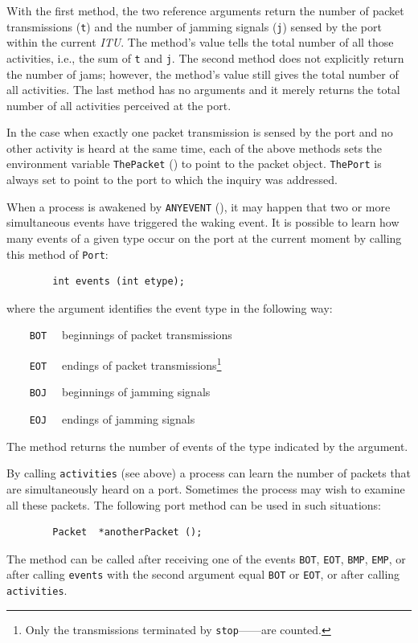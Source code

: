 With the first method,
the two reference arguments return the number of packet transmissions ({\tt t})
and the number of jamming signals ({\tt j}) sensed by the port within
the current {\em ITU}.
The method's value tells the total number of all those activities,
i.e., the sum of {\tt t} and {\tt j}.
The second method does not explicitly
return the number of jams; however, the method's
value still gives the total number of all activities.
The last method has no arguments and it merely returns the total number of all
activities perceived at the port.

In the case when exactly one packet transmission is sensed by the port and
no other activity is heard at the same time, each of the above methods
sets the environment variable {\tt ThePacket} () to point
to the packet object.
{\tt ThePort} is always set to point to the port to which the inquiry was
addressed.

When a process is awakened by {\tt ANYEVENT} (), it may
happen that two or more simultaneous events have triggered the waking
event.
It is possible to learn how many events of a given type
occur on the port at the current moment by calling this method of {\tt Port}:
\begin{verbatim}
        int events (int etype);
\end{verbatim}
where the argument identifies the event type in the following way:

\bigskip

\noindent
{\tt ~~~~BOT~~} beginnings of packet transmissions

\noindent
{\tt ~~~~EOT~~} endings of packet
transmissions\footnote{Only the transmissions terminated by
{\tt stop}------are counted.}

\noindent
{\tt ~~~~BOJ~~} beginnings of jamming signals

\noindent
{\tt ~~~~EOJ~~} endings of jamming signals

\bigskip

\noindent
The method returns the number of events of the type indicated by the argument.

By calling {\tt activities} (see above) a process can learn the number of
packets that are simultaneously heard on a port.
Sometimes the process may wish to examine all these packets.
The following port method can be used in such situations:
\begin{verbatim}
        Packet  *anotherPacket ();
\end{verbatim}
The method can be called after receiving one of the events {\tt BOT},
{\tt EOT}, {\tt BMP}, {\tt EMP}, or after calling
{\tt events} with the second argument equal {\tt BOT} or {\tt EOT}, or
after calling {\tt activities}.

